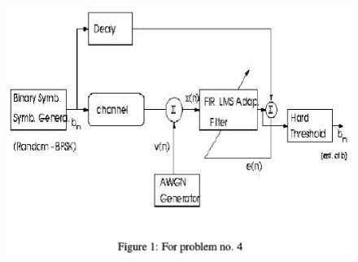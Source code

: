 \documentclass[journal,12pt,twocolumn]{IEEEtran}
\begin{document}
\begin{enumerate}
\begin{center}
\begin{figure}
\includegraphics[width=\columnwidth]{./figs/figure3.eps}
\caption{}
\label{fig:figure3}
\end{figure}


\end{center}
\end{enumerate}
\end{document}
